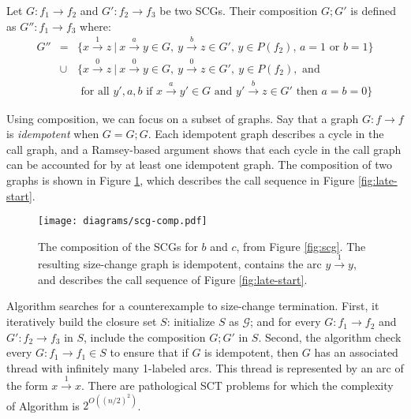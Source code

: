 \documentclass{LMCS}
\newcommand\deqarrow{\ensuremath{\stackrel{0}{\rightarrow}}}
\newcommand\descarrow{\stackrel{1}{\rightarrow}}
\newcommand\vararrow[1]{\stackrel{#1}{\rightarrow}}
\newcommand{\G}{{\mathcal G}}
\begin{document}
\begin{defi} 
Let $G : f_1 \rightarrow f_2$ and $G' : f_2 \rightarrow f_3$ be two SCGs.
Their composition $G;G'$ is defined as $G'' : f_1 \rightarrow f_3$ where:
\begin{eqnarray*}
G'' &=& \{x \descarrow z~|~x \vararrow{a} y \in G,~ y \vararrow{b} z \in G',\,y \in P(f_2),\, a=1\text{ or }b=1\}\\
&\cup&  \{x \deqarrow z~|~x \deqarrow y \in G,~ y \deqarrow z \in G',~ y\in P(f_2),\text{ and}\\
&&\text{   for all } y',a,b \text{ if }x \vararrow{a} y' \in G \text{ and } y' \vararrow{b} z \in G' \text{ then }a=b=0\}
\end{eqnarray*}
\end{defi}


Using composition, we can focus on a subset of graphs. Say that a graph $G : f \rightarrow f$ is
\emph{idempotent} when $G=G;G$. Each idempotent graph describes a cycle in the call graph, and a
Ramsey-based argument shows that each cycle in the call graph can be accounted for by at least one
idempotent graph. The composition of two graphs is shown in Figure \ref{fig:scg-comp}, which
describes the call sequence in Figure \ref{fig:late-start}.

\begin{figure}[tb]
\begin{center}
{\texttt{[image: diagrams/scg-comp.pdf]}}
\end{center}
\caption{The composition of the SCGs for $b$ and $c$, from Figure \ref{fig:scg}. The
resulting size-change graph is idempotent, contains the arc $y \descarrow y$, and
describes the call sequence of Figure \ref{fig:late-start}.}
\label{fig:scg-comp}
\end{figure}

Algorithm \LJB searches for a counterexample to size-change termination.  First, it iteratively
build the closure set $S$: initialize $S$ as $\G$; and for every $G : f_1 \rightarrow f_2$ and $G' :
f_2 \rightarrow f_3$ in $S$, include the composition $G;G'$ in $S$.  Second, the algorithm  check
every $G : f_1 \rightarrow f_1 \in S$ to ensure that if $G$ is idempotent, then $G$ has an
associated thread with infinitely many 1-labeled arcs. This thread is represented by an arc of the
form $x \descarrow x$. There are pathological SCT problems for which the complexity of Algorithm
\LJB is $2^{O((n/2)^2)}$.
\end{document}
